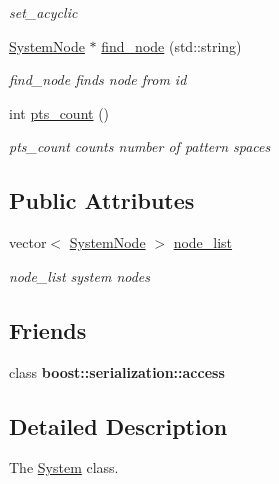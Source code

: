 \begin{DoxyCompactItemize}
\begin{DoxyCompactList}\small\item\em set\+\_\+acyclic \end{DoxyCompactList}\item 
\hyperlink{class_system_node}{System\+Node} $\ast$ \hyperlink{class_system_a3213213c0bcb2cd07d0692dae5715276}{find\+\_\+node} (std\+::string)
\begin{DoxyCompactList}\small\item\em find\+\_\+node finds node from id \end{DoxyCompactList}\item 
int \hyperlink{class_system_ac8f236831ab3c7f946c5a0f6694f86b1}{pts\+\_\+count} ()
\begin{DoxyCompactList}\small\item\em pts\+\_\+count counts number of pattern spaces \end{DoxyCompactList}\end{DoxyCompactItemize}
\subsection*{Public Attributes}
\begin{DoxyCompactItemize}
\item 
vector$<$ \hyperlink{class_system_node}{System\+Node} $>$ \hyperlink{class_system_a1594bcbf0c3297a2b2bc5c66ae3dda91}{node\+\_\+list}\hypertarget{class_system_a1594bcbf0c3297a2b2bc5c66ae3dda91}{}\label{class_system_a1594bcbf0c3297a2b2bc5c66ae3dda91}

\begin{DoxyCompactList}\small\item\em node\+\_\+list system nodes \end{DoxyCompactList}\end{DoxyCompactItemize}
\subsection*{Friends}
\begin{DoxyCompactItemize}
\item 
class {\bfseries boost\+::serialization\+::access}\hypertarget{class_system_ac98d07dd8f7b70e16ccb9a01abf56b9c}{}\label{class_system_ac98d07dd8f7b70e16ccb9a01abf56b9c}

\end{DoxyCompactItemize}


\subsection{Detailed Description}
The \hyperlink{class_system}{System} class. 

